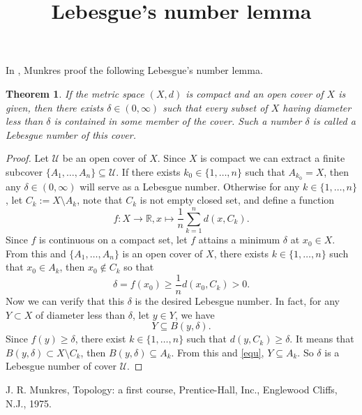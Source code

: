 \documentclass[a4paper,12pt]{article}
\title{Lebesgue's number lemma}
\author{}
\date{}
\newtheorem{theorem}{Theorem}
\begin{document}
\maketitle

In \cite[Lemma 7.2]{m75}, Munkres proof the following Lebesgue's number lemma.

\begin{theorem}
    If the metric space $ (X, d) $ is compact and an open cover of $ X $ is given, 
    then there exists $ \delta \in (0, \infty) $ such that every subset of $ X $ 
    having diameter less than $ \delta $ is contained in some member of the cover.
    Such a number $ \delta $ is called a Lebesgue number of this cover. 
\end{theorem}

\begin{proof}
    Let $ \mathcal{U} $ be an open cover of $ X $. Since $ X $ is compact 
    we can extract a finite subcover $ \{A_{1},\dots ,A_{n}\} \subseteq \mathcal{U} $. 
    If there exists $ k_0 \in \{1, \ldots, n\} $ such that $ A_{k_0} = X $, 
    then any $ \delta \in (0, \infty) $ will serve as a Lebesgue number. 
    Otherwise for any $ k \in \{1, \dots, n\} $, let $ C_k := X \setminus A_k $, 
    note that $ C_k $ is not empty closed set, and define a function
    $$
        f: X \rightarrow \mathbb{R}, x \mapsto \frac{1}{n} \sum_{k = 1}^n d(x, C_k).
    $$
    Since $ f $ is continuous on a compact set, let $ f $ attains a minimum $ \delta $ at $ x_0 \in X $. 
    From this and $ \{A_1, \dots, A_n\} $ is an open cover of $ X $, there exists $ k \in \{1, \ldots, n\} $ 
    such that $ x_0 \in A_k $, then $ x_0 \notin C_k $ so that
    $$
        \delta = f(x_0) \geq \frac{1}{n} d(x_0, C_k) > 0.
    $$
    Now we can verify that this $ \delta $ is the desired Lebesgue number. 
    In fact, for any $ Y \subset X $ of diameter less than $ \delta $, let $ y \in Y $, we have 
    \begin{equation} \label{equ}
        Y \subseteq B(y, \delta).
    \end{equation} 
    Since $ f(y) \geq \delta $, there exist $ k \in \{1, \ldots, n\} $ 
    such that $ d(y, C_k) \geq \delta $. It means that $ B(y, \delta) \subset X \setminus C_k $,
    then $ B(y, \delta) \subseteq A_k $. From this and \eqref{equ}, $ Y \subseteq A_k $. 
    So $ \delta $ is a Lebesgue number of cover $ \mathcal{U} $.
\end{proof}

\begin{thebibliography}{99}

     J. R. Munkres, Topology: a first course, Prentice-Hall, Inc., Englewood Cliffs, N.J.,  1975.
    
\end{thebibliography}
\end{document}
